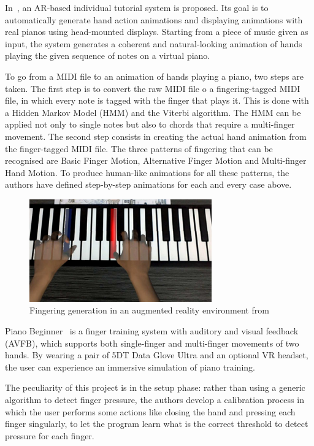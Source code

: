 In~\cite{fingering-generation}, an AR-based individual tutorial system is proposed.
Its goal is to automatically generate hand action animations
and displaying animations with real pianos using head-mounted displays.
Starting from a piece of music given as input, the system generates a coherent and natural-looking
animation of hands playing the given sequence of notes on a virtual piano.

To go from a MIDI file to an animation of hands playing a piano, two steps are taken.
The first step is to convert the raw MIDI file o a fingering-tagged MIDI file,
in which every note is tagged with the finger that plays it.
This is done with a Hidden Markov Model (HMM) and the Viterbi algorithm.
The HMM can be applied not only to single notes but also to chords that require a multi-finger movement.
The second step consists in creating the actual hand animation from the finger-tagged MIDI file.
The three patterns of fingering that can be recognised are Basic Finger Motion,
Alternative Finger Motion and Multi-finger Hand Motion.
To produce human-like animations for all these patterns,
the authors have defined step-by-step animations for each and every case above.

\begin{figure}
	\center
	\includegraphics[width=0.7\textwidth]{images/related-work/fingering-generation}
	\caption{Fingering generation in an augmented reality environment from~\protect\cite{fingering-generation}}
	\label{fig:fingering-generation}
\end{figure}

Piano Beginner~\cite{piano-glove-training} is a finger training system with auditory and visual feedback (AVFB),
which supports both single-finger and multi-finger movements of two hands.
By wearing a pair of 5DT Data Glove Ultra and an optional VR headset, the user can experience an immersive simulation
of piano training.

The peculiarity of this project is in the setup phase:
rather than using a generic algorithm to detect finger pressure, the authors develop a calibration process
in which the user performs some actions like closing the hand and pressing each finger singularly,
to let the program learn what is the correct threshold to detect pressure for each finger.

